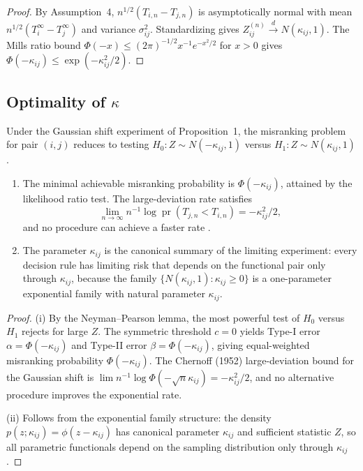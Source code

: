 \documentclass[lineno]{biometrika}
\DeclareMathOperator{\pr}{pr}
\begin{document}
\begin{proof}
By Assumption~4, $n^{1/2}(T_{i,n} - T_{j,n})$ is asymptotically normal with mean $n^{1/2}(T_i^\infty - T_j^\infty)$ and variance $\sigma_{ij}^2$. Standardizing gives $Z_{ij}^{(n)} \xrightarrow{d} N(\kappa_{ij}, 1)$. The Mills ratio bound $\Phi(-x) \leq (2\pi)^{-1/2} x^{-1} e^{-x^2/2}$ for $x>0$ gives $\Phi(-\kappa_{ij}) \leq \exp(-\kappa_{ij}^2/2)$.
\end{proof}

\subsection{Optimality of $\kappa$}

\begin{lemma}\label{lem:opt}
Under the Gaussian shift experiment of Proposition~1, the misranking problem for pair $(i,j)$ reduces to testing $H_0: Z \sim N(-\kappa_{ij},1)$ versus $H_1: Z \sim N(\kappa_{ij},1)$.
\begin{enumerate}
\item[(i)] The minimal achievable misranking probability is $\Phi(-\kappa_{ij})$, attained by the likelihood ratio test. The large-deviation rate satisfies
\[
\lim_{n\to\infty} n^{-1}\log\pr(T_{j,n} < T_{i,n}) = -\kappa_{ij}^2/2,
\]
and no procedure can achieve a faster rate \citep{Chernoff:1952}.
\item[(ii)] The parameter $\kappa_{ij}$ is the canonical summary of the limiting experiment: every decision rule has limiting risk that depends on the functional pair only through $\kappa_{ij}$, because the family $\{N(\kappa_{ij},1):\kappa_{ij}\geq0\}$ is a one-parameter exponential family with natural parameter $\kappa_{ij}$.
\end{enumerate}
\end{lemma}

\begin{proof}
(i) By the Neyman--Pearson lemma, the most powerful test of $H_0$ versus $H_1$ rejects for large $Z$. The symmetric threshold $c=0$ yields Type-I error $\alpha = \Phi(-\kappa_{ij})$ and Type-II error $\beta = \Phi(-\kappa_{ij})$, giving equal-weighted misranking probability $\Phi(-\kappa_{ij})$. The Chernoff (1952) large-deviation bound for the Gaussian shift is $\lim n^{-1}\log\Phi(-\sqrt{n}\kappa_{ij}) = -\kappa_{ij}^2/2$, and no alternative procedure improves the exponential rate.

(ii) Follows from the exponential family structure: the density $p(z;\kappa_{ij}) = \phi(z-\kappa_{ij})$ has canonical parameter $\kappa_{ij}$ and sufficient statistic $Z$, so all parametric functionals depend on the sampling distribution only through $\kappa_{ij}$.
\end{proof}
\end{document}

